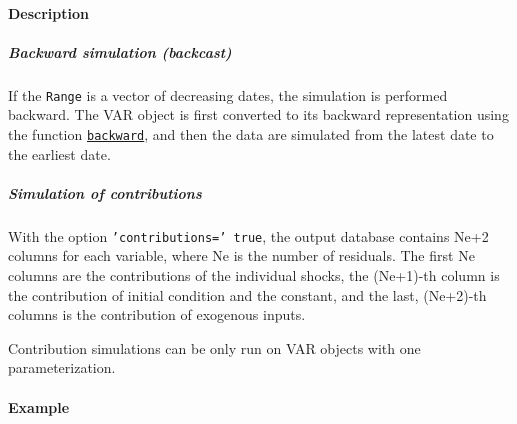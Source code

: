 \paragraph{Description}

\subparagraph{Backward simulation
(backcast)}

If the \texttt{Range} is a vector of decreasing dates, the simulation is
performed backward. The VAR object is first converted to its backward
representation using the function
\href{VAR/backward}{\texttt{backward}}, and then the data are simulated
from the latest date to the earliest date.

\subparagraph{Simulation of
contributions}

With the option \texttt{'contributions=' true}, the output database
contains Ne+2 columns for each variable, where Ne is the number of
residuals. The first Ne columns are the contributions of the individual
shocks, the (Ne+1)-th column is the contribution of initial condition
and the constant, and the last, (Ne+2)-th columns is the contribution of
exogenous inputs.

Contribution simulations can be only run on VAR objects with one
parameterization.

\paragraph{Example}


